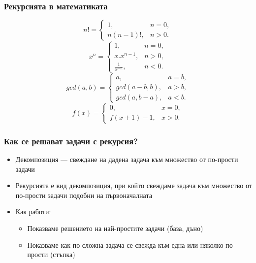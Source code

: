 \documentclass[alsotrans]{beamerswitch}
\begin{document}
\begin{frame}
  \frametitle{Рекурсията в математиката}

  \begin{equation*}
    n! =
    \begin{cases}
      1,& n = 0,\\
      n(n-1)!,&n > 0.
    \end{cases}
  \end{equation*}
  \pause
  \begin{equation*}
    x^n =
    \begin{cases}
      1,&n = 0,\\
      x.x^{n-1},&n > 0,\\
      \frac1{x^{-n}},&n<0.
    \end{cases}
  \end{equation*}
  \pause
  \begin{equation*}
    gcd(a,b)=
    \begin{cases}
      a,&a = b,\\
      gcd(a-b,b),&a>b,\\
      gcd(a,b-a),&a<b.
    \end{cases}
  \end{equation*}
  \pause
  \begin{equation*}
    f(x)=
    \begin{cases}
      0,&x = 0,\\
      f(x+1)-1,&x>0.
    \end{cases}
  \end{equation*}
\end{frame}

\begin{frame}
  \frametitle{Как се решават задачи с рекурсия?}

  \begin{itemize}[<+->]
  \item \alert{Декомпозиция} --- свеждане на дадена задача към множество от по-прости задачи
  \item Рекурсията е вид декомпозиция, при който свеждаме задача към множество от по-прости задачи \alert{подобни на първоначалната}
  \item Как работи:
    \begin{itemize}
    \item Показваме решението на най-простите задачи \alert{(база, дъно)}
    \item Показваме как по-сложна задача се свежда към една или няколко по-прости \alert{(стъпка)}
    \end{itemize}
  \end{itemize}
\end{frame}
\end{document}
